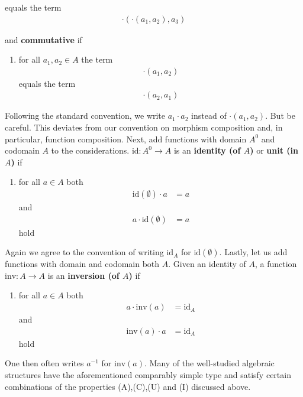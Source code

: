 \begin{exa}
\begin{enumerate}
equals the term
\begin{align*}
  \cdot
  \left(
    \cdot(a_{1},a_{2}),
    a_{3}
  \right)
\end{align*}
\end{enumerate}
and \textbf{commutative} if
\begin{enumerate}
\item[(C)]
for all $a_{1},a_{2} \in A$ the term
\begin{align*}
  \cdot(a_{1},a_{2})
\end{align*}
equals the term
\begin{align*}
  \cdot(a_{2},a_{1})
\end{align*}
\end{enumerate}
Following the standard convention, we write $a_{1} \cdot a_{2}$ instead of $\cdot(a_{1},a_{2})$.
But be careful.
This deviates from our convention on morphism composition and, in particular, function composition.
Next, add functions with domain $A^{0}$ and codomain $A$ to the considerations.
$\mathrm{id} \colon A^{0} \rightarrow A$ is an \textbf{identity (of $A$)} or \textbf{unit (in $A$)} if
\begin{enumerate}
\item[(U)]
for all $a \in A$ both
\begin{align*}
  \mathrm{id}(\emptyset)
  \cdot
  a
  &=
  a
\end{align*}
and
\begin{align*}
  a
  \cdot
  \mathrm{id}(\emptyset)
  &=
  a
\end{align*}
hold
\end{enumerate}
Again we agree to the convention of writing $\mathrm{id}_{A}$ for $\mathrm{id}(\emptyset)$.
Lastly, let us add functions with domain and codomain both $A$.
Given an identity of $A$, a function $\mathrm{inv} \colon A \rightarrow A$ is an \textbf{inversion (of $A$)} if
\begin{enumerate}
\item[(I)]
for all $a \in A$  both
\begin{align*}
  a
  \cdot
  \mathrm{inv}(a)
  &=
  \mathrm{id}_{A}
\end{align*}
and
\begin{align*}
  \mathrm{inv}(a)
  \cdot
  a
  &=
  \mathrm{id}_{A}
\end{align*}
hold
\end{enumerate}
One then often writes $a^{-1}$ for $\mathrm{inv}(a)$.
Many of the well-studied algebraic structures have the aforementioned comparably simple type and satisfy certain combinations of the properties (A),(C),(U) and (I) discussed above.

\end{exa}
